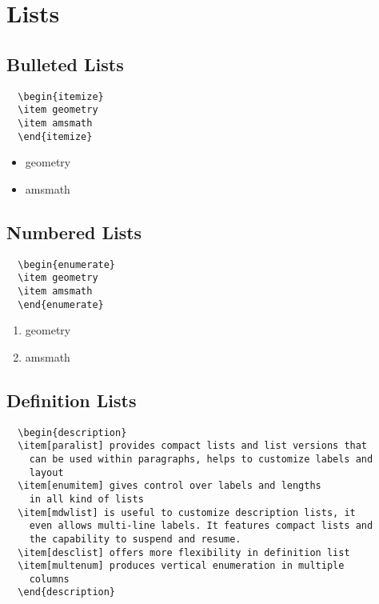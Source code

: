\chapter{Lists}
\section{Bulleted Lists}

\begin{lstlisting}
  \begin{itemize}
  \item geometry
  \item amsmath
  \end{itemize}
\end{lstlisting}

\begin{tcolorbox}
  \begin{itemize}
  \item geometry
  \item amsmath
  \end{itemize}
\end{tcolorbox}

\section{Numbered Lists}
\begin{lstlisting}
  \begin{enumerate}
  \item geometry
  \item amsmath
  \end{enumerate}
\end{lstlisting}

\begin{tcolorbox}
  \begin{enumerate}
  \item geometry
  \item amsmath
  \end{enumerate}
\end{tcolorbox}



\section{Definition Lists}
\begin{lstlisting}
  \begin{description}
  \item[paralist] provides compact lists and list versions that
    can be used within paragraphs, helps to customize labels and
    layout
  \item[enumitem] gives control over labels and lengths
    in all kind of lists
  \item[mdwlist] is useful to customize description lists, it
    even allows multi-line labels. It features compact lists and
    the capability to suspend and resume.
  \item[desclist] offers more flexibility in definition list
  \item[multenum] produces vertical enumeration in multiple
    columns
  \end{description}
\end{lstlisting}

